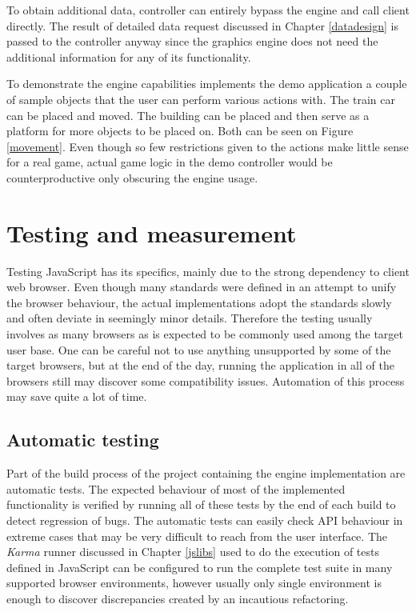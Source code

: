 \documentclass[11pt,oneside, final]{fithesis2}
\begin{document}
To obtain additional data, controller can entirely bypass the engine and call client directly. The result of detailed data request discussed in Chapter \ref{datadesign} is passed to the controller anyway since the graphics engine does not need the additional information for any of its functionality.

To demonstrate the engine capabilities implements the demo application a couple of sample objects that the user can perform various actions with. The train car can be placed and moved. The building can be placed and then serve as a platform for more objects to be placed on. Both can be seen on Figure \ref{movement}. Even though so few restrictions given to the actions make little sense for a real game, actual game logic in the demo controller would be counterproductive only obscuring the engine usage.

\chapter{Testing and measurement}
\label{testing}
Testing JavaScript has its specifics, mainly due to the strong dependency to client web browser. Even though many standards were defined in an attempt to unify the browser behaviour, the actual implementations adopt the standards slowly and often deviate in seemingly minor details. Therefore the testing usually involves as many browsers as is expected to be commonly used among the target user base. One can be careful not to use anything unsupported by some of the target browsers, but at the end of the day, running the application in all of the browsers still may discover some compatibility issues. Automation of this process may save quite a lot of time. 

\section{Automatic testing}
Part of the build process of the project containing the engine implementation are automatic tests. The expected behaviour of most of the implemented functionality is verified by running all of these tests by the end of each build to detect regression of bugs. The automatic tests can easily check API behaviour in extreme cases that may be very difficult to reach from the user interface. The \emph{Karma} runner discussed in Chapter \ref{jslibs} used to do the execution of tests defined in JavaScript can be configured to run the complete test suite in many supported browser environments, however usually only single environment is enough to discover discrepancies created by an incautious refactoring. 
\end{document}
